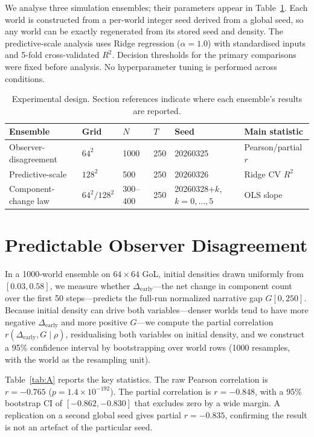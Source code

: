 \documentclass[aip,cha,preprint,nofootinbib]{revtex4-2}
\newcommand{\Dearly}{\Delta_{\mathrm{early}}}
\begin{document}
We analyse three simulation ensembles; their parameters appear in
Table~\ref{tab:design}.
Each world is constructed from a per-world integer seed derived from a global
seed, so any world can be exactly regenerated from its stored seed and
density.
The predictive-scale analysis uses Ridge regression ($\alpha=1.0$) with
standardised inputs and 5-fold cross-validated $R^2$.
Decision thresholds for the primary comparisons were fixed before analysis.
No hyperparameter tuning is performed across conditions.

\begin{table}
\centering
\caption{Experimental design. Section references indicate where each
ensemble's results are reported.}
\label{tab:design}
\begin{tabular}{p{4.8cm}llllp{3cm}}
\toprule
Ensemble & Grid & $N$ & $T$ & Seed & Main statistic \\
\midrule
Observer-disagreement  & $64^2$         & 1000     & 250 & 20260325      & Pearson/partial $r$ \\
Predictive-scale       & $128^2$        & 500      & 250 & 20260326      & Ridge CV $R^2$ \\
Component-change law   & $64^2/128^2$   & 300--400 & 250 & 20260328+$k$, $k=0,\ldots,5$ & OLS slope \\
\bottomrule
\end{tabular}
\end{table}

\section{Predictable Observer Disagreement}
\label{sec:A}

In a 1000-world ensemble on $64\times64$ GoL, initial densities drawn
uniformly from $[0.03,0.58]$, we measure whether $\Dearly$---the net change
in component count over the first 50 steps---predicts the full-run normalized
narrative gap $G[0,250]$.
Because initial density can drive both variables---denser worlds tend to have
more negative $\Dearly$ and more positive $G$---we compute the partial
correlation
$r(\Dearly, G\mid\rho)$, residualising both variables on initial density,
and we construct a 95\% confidence interval by bootstrapping over world rows
(1000 resamples, with the world as the resampling unit).

Table~\ref{tab:A} reports the key statistics.
The raw Pearson correlation is $r=-0.765$ ($p=1.4\times10^{-192}$).
The partial correlation is $r=-0.848$, with a 95\% bootstrap CI of
$[-0.862,-0.830]$ that excludes zero by a wide margin.
A replication on a second global seed gives partial $r=-0.835$,
confirming the result is not an artefact of the particular seed.
\end{document}
